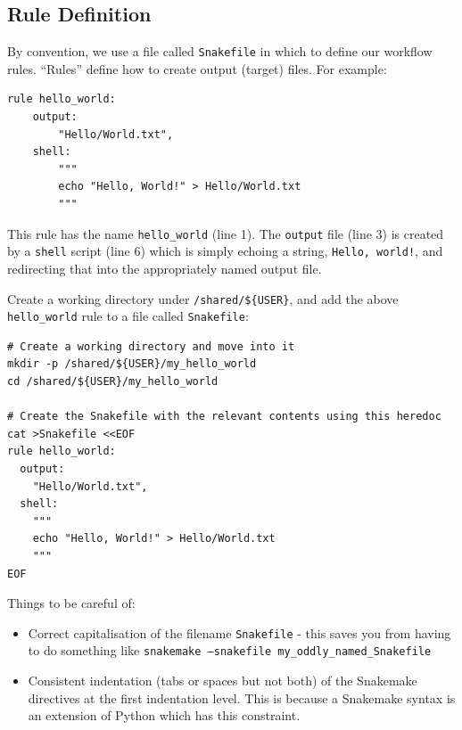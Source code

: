 \subsection{Rule Definition}

By convention, we use a file called \texttt{Snakefile} in which to define our workflow rules. ``Rules'' define how to
create output (target) files. For example:

\begin{lstlisting}
rule hello_world:
	output:
		"Hello/World.txt",
	shell:
		"""
		echo "Hello, World!" > Hello/World.txt
		"""
\end{lstlisting}

This rule has the name \texttt{hello\_world} (line 1). The \texttt{output} file (line 3) is created by a \texttt{shell} script (line 6) which is
simply echoing a string, \texttt{Hello, world!}, and redirecting that into the appropriately named output file.

\begin{steps}

Create a working directory under \texttt{/shared/\$\{USER\}}, and add the above \texttt{hello\_world} rule to a file called \texttt{Snakefile}:

\begin{lstlisting}
# Create a working directory and move into it
mkdir -p /shared/${USER}/my_hello_world
cd /shared/${USER}/my_hello_world

# Create the Snakefile with the relevant contents using this heredoc
cat >Snakefile <<EOF
rule hello_world:
  output:
    "Hello/World.txt",
  shell:
    """
    echo "Hello, World!" > Hello/World.txt
    """
EOF
\end{lstlisting}

\end{steps}

\begin{note}

Things to be careful of:

\begin{itemize}
  \item Correct capitalisation of the filename \texttt{Snakefile} - this saves you from having to do something like \texttt{snakemake --snakefile my\_oddly\_named\_Snakefile}
  \item Consistent indentation (tabs or spaces but not both) of the Snakemake directives at the first indentation level. This is because a Snakemake syntax is
        an extension of Python which has this constraint.
\end{itemize}

\end{note}

